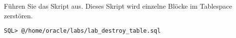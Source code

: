     \item F\"uhren Sie das Skript  aus. Dieses Skript wird einzelne Bl\"ocke im Tablespace  zerst\"oren.
      \begin{lstlisting}[language=terminal]
SQL> @/home/oracle/labs/lab_destroy_table.sql
      \end{lstlisting}
